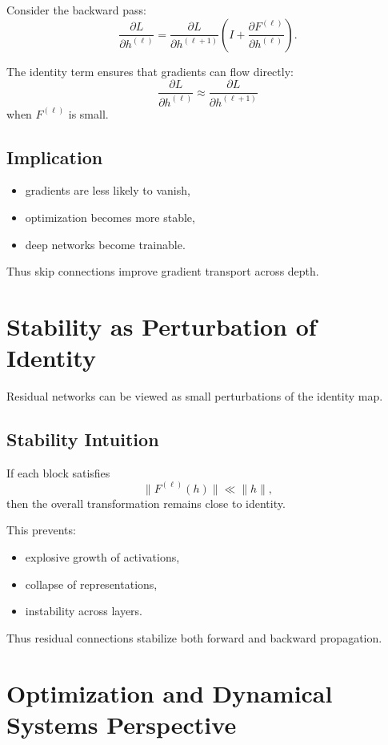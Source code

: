 Consider the backward pass:
\[
\frac{\partial L}{\partial h^{(\ell)}}
=
\frac{\partial L}{\partial h^{(\ell+1)}}
\left(I + \frac{\partial F^{(\ell)}}{\partial h^{(\ell)}}\right).
\]

The identity term ensures that gradients can flow directly:
\[
\frac{\partial L}{\partial h^{(\ell)}} \approx \frac{\partial L}{\partial h^{(\ell+1)}}
\]
when $F^{(\ell)}$ is small.

\subsection{Implication}

\begin{itemize}
    \item gradients are less likely to vanish,
    \item optimization becomes more stable,
    \item deep networks become trainable.
\end{itemize}

Thus skip connections improve gradient transport across depth.

\section{Stability as Perturbation of Identity}

Residual networks can be viewed as small perturbations of the identity map.

\subsection{Stability Intuition}

If each block satisfies
\[
\|F^{(\ell)}(h)\| \ll \|h\|,
\]
then the overall transformation remains close to identity.

This prevents:
\begin{itemize}
    \item explosive growth of activations,
    \item collapse of representations,
    \item instability across layers.
\end{itemize}

Thus residual connections stabilize both forward and backward propagation.

\section{Optimization and Dynamical Systems Perspective}

